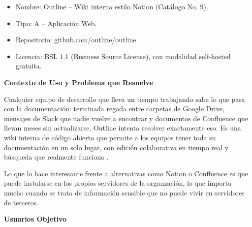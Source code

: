\documentclass{report}
\begin{document}
\begin{itemize}
    \item Nombre: Outline -- Wiki interna estilo Notion (Catálogo No. 9).
    \item Tipo: A -- Aplicación Web.
    \item Repositorio: github.com/outline/outline
    \item Licencia: BSL 1.1 (Business Source License), con modalidad self-hosted gratuita.
\end{itemize}

\textbf{Contexto de Uso y Problema que Resuelve}

Cualquier equipo de desarrollo que lleva un tiempo trabajando sabe lo que pasa con la documentación: terminada regada entre carpetas de Google Drive, mensajes de Slack que nadie vuelve a encontrar y documentos de Confluence que llevan meses sin actualizarse. Outline intenta resolver exactamente eso. Es una wiki interna de código abierto que permite a los equipos tener toda su documentación en un solo lugar, con edición colaborativa en tiempo real y búsqueda que realmente funciona \cite{outline2025}.

Lo que lo hace interesante frente a alternativas como Notion o Confluence es que puede instalarse en los propios servidores de la organzación, lo que importa mucho cuando se trata de información sensible que no puede vivir en servidores de terceros.

\textbf{Usuarios Objetivo}
\end{document}
